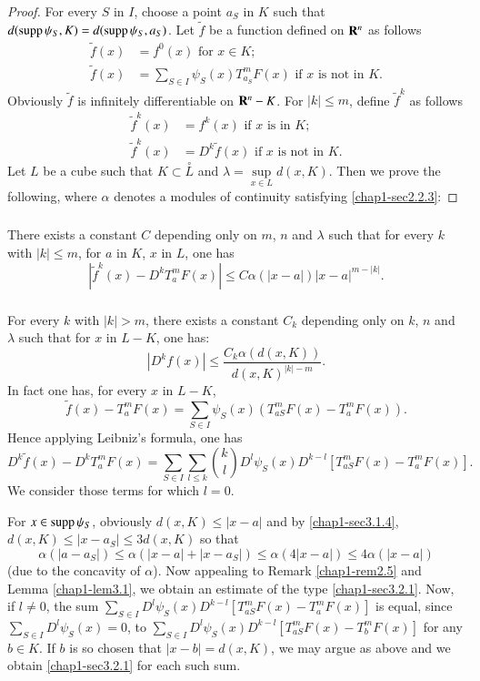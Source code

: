 \begin{proof}
For every $S$ in $I$, choose a point $a_{S}$ in $K$ such that $d(\operatorname{supp} \psi_{S},K)=d(\operatorname{supp} \psi_{S},a_{S})$. Let $\widetilde{f}$ be a function defined on $\mathbf{R}^{n}$ as follows
\begin{align*}
\widetilde{f}(x) &= f^{0}(x)\text{ for } x\in K;\\
\widetilde{f}(x) &= \sum\limits_{S\in I}\psi_{S}(x)T^{m}_{a_{S}}F(x)\text{ if $x$ is not in $K$.}
\end{align*}
Obviously $\widetilde{f}$ is infinitely differentiable on $\mathbf{R}^{n}-K$. For $|k|\leq m$, define $\widetilde{f}^{k}$ as follows
\begin{align*}
\widetilde{f}^{k}(x) &= f^{k}(x)\text{ if $x$ is in $K$;}\\
\widetilde{f}^{k}(x) &= D^{k}\widetilde{f}(x)\text{ if $x$ is not in $K$.}
\end{align*}
Let $L$ be a cube such that $K\subset \overset{\circ}{L}$ and $\lambda = \sup\limits_{x\in L}d(x,K)$. Then we prove the following, where $\alpha$ denotes a modules of continuity satisfying \eqref{chap1-sec2.2.3}:
\end{proof}

\setcounter{subsection}{2}
\setcounter{subsubsection}{0}
\subsubsection{}\label{chap1-sec3.2.1}\pageoriginale
There exists a constant $C$ depending only on $m$, $n$ and $\lambda$ such that for every $k$ with $|k|\leq m$, for $a$ in $K$, $x$ in $L$, one has
$$
|\widetilde{f}^{k}(x)-D^{k}T^{m}_{a}F(x)|\leq C\alpha (|x-a|)|x-a|^{m-|k|}.
$$
\subsubsection{}\label{chap1-sec3.2.2}
For every $k$ with $|k|>m$, there exists a constant $C_{k}$ depending only on $k$, $n$ and $\lambda$ such that for $x$ in $L-K$, one has:
$$
|D^{k}f(x)|\leq \dfrac{C_{k}\alpha(d(x,K))}{d(x,K)^{|k|-m}}.
$$
In fact one has, for every $x$ in $L-K$,
$$
\widetilde{f}(x)-T^{m}_{a}F(x)=\sum\limits_{S\in I}\psi_{S}(x)(T^{m}_{aS}F(x)-T^{m}_{a}F(x)).
$$
Hence applying Leibniz's formula, one has
$$
D^{k}\widetilde{f}(x)-D^{k}T^{m}_{a}F(x)=\sum\limits_{S\in I}\sum\limits_{l\leq k}\binom{k}{l}D^{l}\psi_{S}(x)D^{k-l}[T^{m}_{aS}F(x)-T^{m}_{a}F(x)].
$$
We consider those terms for which $l=0$.

For $x\in \operatorname{supp} \psi_{S}$, obviously $d(x,K)\leq |x-a|$ and by \eqref{chap1-sec3.1.4}, $d(x,K)\leq |x-a_{S}|\leq 3d(x,K)$ so that
$$
\alpha(|a-a_{S}|)\leq \alpha(|x-a|+|x-a_{S}|)\leq \alpha(4|x-a|)\leq 4\alpha(|x-a|)
$$
(due to the concavity of $\alpha$). Now appealing to Remark \ref{chap1-rem2.5} and Lemma \ref{chap1-lem3.1}, we obtain an estimate of the type \eqref{chap1-sec3.2.1}. Now, if $l\neq 0$, the sum $\sum\limits_{S\in I}D^{l}\psi_{S}(x)D^{k-l}[T^{m}_{aS}F(x)-T^{m}_{a}F(x)]$ is equal, since $\sum\limits_{S\in I}D^{l}\psi_{S}(x)=0$, to $\sum\limits_{S\in I}D^{l}\psi_{S}(x)D^{k-l}[T^{m}_{aS}F(x)-T^{m}_{b}F(x)]$ for any $b\in K$. If $b$ is so chosen that $|x-b|=d(x,K)$, we may argue as above and we obtain \eqref{chap1-sec3.2.1} for each such sum.

